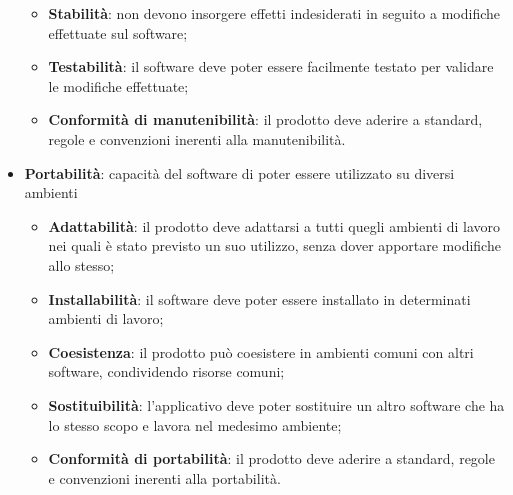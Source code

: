 \begin{itemize}
\begin{itemize}
\item\textbf{Stabilità}: non devono insorgere effetti indesiderati in seguito a modifiche effettuate sul software;
\item\textbf{Testabilità}: il software deve poter essere facilmente testato per validare le modifiche effettuate;
\item\textbf{Conformità di manutenibilità}: il prodotto deve aderire a standard, regole e convenzioni inerenti alla manutenibilità.
\end{itemize}
\item\textbf{Portabilità}: capacità del software di poter essere utilizzato su diversi ambienti
\begin{itemize}
\item\textbf{Adattabilità}: il prodotto deve adattarsi a tutti quegli ambienti di lavoro nei quali è stato previsto un suo utilizzo, senza dover apportare modifiche allo stesso;
\item\textbf{Installabilità}: il software deve poter essere installato in determinati ambienti di lavoro;
\item\textbf{Coesistenza}: il prodotto può coesistere in ambienti comuni
con altri software, condividendo risorse comuni;
\item\textbf{Sostituibilità}: l'applicativo deve poter sostituire un altro software che ha lo stesso scopo e lavora nel medesimo ambiente;
\item\textbf{Conformità di portabilità}: il prodotto deve aderire a standard, regole e convenzioni inerenti alla portabilità.
\end{itemize}
\end{itemize}	